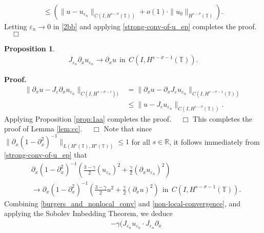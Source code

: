 \documentclass[12pt,reqno]{amsart}
\newcommand{\rr}{\mathbb{R}}
\newcommand{\p}{\partial}
\newcommand{\ci}{\mathbb{T}}
\newcommand{\ee}{\varepsilon}
\theoremstyle{plain}  %
\newtheorem{proposition}{Proposition}
\theoremstyle{definition}
\begin{document}
\begin{appendices}
\begin{equation}
\begin{split}
					\le \left( \| u -  u_{\ee_n}
					\|_{C(I, H^{s-\sigma}(\ci))} + o(1) \cdot \|u_0
					\|_{H^{s-\sigma}(\ci)} \right).
				\end{split}
			\end{equation}
			Letting $\ee_n \to 0$ in \eqref{2bb} and applying
			\eqref{strong-conv-of-u_ep} completes the proof. $\quad \Box$
			\begin{proposition}
				\label{prop:dd}
				\begin{equation}
					\begin{split}
						 J_{\ee_n} \p_x u_{\ee_n} \to  \p_x u \ \
						\text{in} \ \ C(I, H^{s-\sigma-1}(\ci)).
						\label{0dd}
					\end{split}
				\end{equation}
			\end{proposition}
			{\bf Proof.} 
			\begin{equation*}
				\begin{split}
					\|\p_x u - J_\ee \p_x u_{\ee_n} \|_{C(I,
					H^{s-\sigma-1}))}  
					& = \|\p_x u - \p_x J_\ee u_{\ee_n} \|_{C(I,
					H^{s-\sigma-1}(\ci))} 
					\\
					& \le \|u - J_\ee u_{\ee_n} \|_{C(I,
					H^{s-\sigma}(\ci))}.
				\end{split}
			\end{equation*}
			Applying Proposition \ref{prop:1aa} completes the proof. $\quad
			\Box$
			\vskip0.1in
			This completes the proof of Lemma \ref{lem:cc}. $\quad \Box$
		\vskip0.1in
		Note that since $\|\p_x (1-\p_x^2)^{-1}\|_{L(H^s(\ci), H^s(\ci))}
		\le 1$ for all $s \in \rr$, it follows immediately from
		\eqref{strong-conv-of-u_ep} that
		\begin{equation}
			\begin{split}
				& \p_x(1- \p_x^2)^{-1} \left( \frac{3-\gamma}{2}
				(u_{\ee_n})^2
				 + \frac{\gamma}{2} (\p_x u_{\ee_n})^2 \right )
				 \\
				 & \to
				 \p_x(1- \p_x^2)^{-1} \left( \frac{3-\gamma}{2} u^2
				 + \frac{\gamma}{2} (\p_x u)^2 \right ) \ \
				 \text{in} \ \ C(I, H^{s-\sigma-1}(\ci)).
				\label{non-local-convergence}
			\end{split}
		\end{equation}
		Combining \eqref{burgers_and_nonlocal_conv} and
		\eqref{non-local-convergence}, and applying the Sobolev Imbedding
		Theorem, we deduce 
		\begin{equation}
			\begin{split}
				& -\gamma (J_{\ee_n} u_{\ee_n} \cdot J_{\ee_n} \p_x

\end{split}
\end{equation}
\end{appendices}
\end{document}

